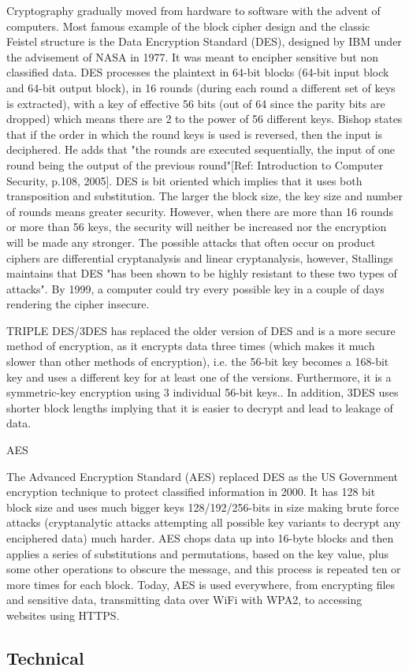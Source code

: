 Cryptography gradually moved from hardware to software with the advent of computers. Most famous example of the block cipher design and the classic Feistel structure is the Data Encryption Standard (DES), designed by IBM under the advisement of NASA in 1977. It was meant to encipher sensitive but non classified data. DES processes the plaintext in 64-bit blocks (64-bit input block and 64-bit output block), in 16 rounds (during each round  a different set of keys is extracted), with a key of effective 56 bits (out of 64 since the parity bits are dropped) which means there are 2 to the power of 56 different keys. Bishop states that if the order in which the round keys is used is reversed, then the input is deciphered. He adds that "the rounds are executed sequentially, the input of one round being the output of the previous round"[Ref: Introduction to Computer Security, p.108, 2005]. DES is bit oriented which implies that it uses both transposition and substitution. The larger the block size, the key size and number of rounds means greater security. However, when there are more than 16 rounds or more than 56 keys, the security will neither be increased nor the encryption will be made any stronger. The possible attacks that often occur on product ciphers are differential cryptanalysis and linear cryptanalysis, however, Stallings maintains that DES "has been shown to be highly resistant to these two types of attacks". By 1999, a computer could try every possible key in a couple of days rendering the cipher insecure.

TRIPLE DES/3DES has replaced the older version of DES and is a more secure method of encryption, as it encrypts data three times (which makes it much slower than other methods of encryption), i.e. the 56-bit key becomes a 168-bit key and uses a different key for at least one of the versions. Furthermore,  it is a symmetric-key encryption using 3 individual 56-bit keys.. In addition, 3DES uses shorter block lengths implying  that it is easier to decrypt and lead to leakage of data.

AES

The Advanced Encryption Standard (AES) replaced DES as the US Government encryption technique to protect classified information  in 2000. It has 128 bit block size and uses much bigger keys 128/192/256-bits in size making brute force attacks (cryptanalytic attacks attempting all possible key variants to decrypt any enciphered data) much harder. AES chops data up into 16-byte blocks and then applies a series of substitutions and permutations, based on the key value, plus some other operations to obscure the message, and this process is repeated ten or more times for each block. Today, AES is used everywhere, from encrypting files and sensitive data, transmitting data over WiFi with WPA2, to accessing websites using HTTPS. 

\subsection{Technical}